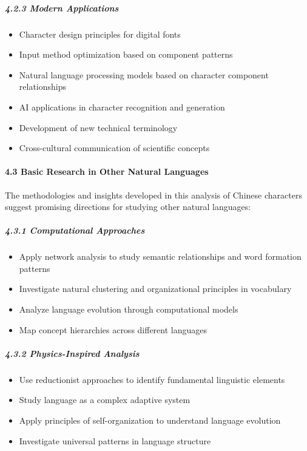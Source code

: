 \hypertarget{modern-applications}{%
\subparagraph{4.2.3 Modern Applications}\label{modern-applications}}

\begin{itemize}
\tightlist
\item
  Character design principles for digital fonts
\item
  Input method optimization based on component patterns
\item
  Natural language processing models based on character component
  relationships
\item
  AI applications in character recognition and generation
\item
  Development of new technical terminology
\item
  Cross-cultural communication of scientific concepts
\end{itemize}

\hypertarget{basic-research-in-other-natural-languages}{%
\paragraph{4.3 Basic Research in Other Natural
Languages}\label{basic-research-in-other-natural-languages}}

The methodologies and insights developed in this analysis of Chinese
characters suggest promising directions for studying other natural
languages:

\hypertarget{computational-approaches}{%
\subparagraph{4.3.1 Computational
Approaches}\label{computational-approaches}}

\begin{itemize}
\tightlist
\item
  Apply network analysis to study semantic relationships and word
  formation patterns
\item
  Investigate natural clustering and organizational principles in
  vocabulary
\item
  Analyze language evolution through computational models
\item
  Map concept hierarchies across different languages
\end{itemize}

\hypertarget{physics-inspired-analysis}{%
\subparagraph{4.3.2 Physics-Inspired
Analysis}\label{physics-inspired-analysis}}

\begin{itemize}
\tightlist
\item
  Use reductionist approaches to identify fundamental linguistic
  elements
\item
  Study language as a complex adaptive system
\item
  Apply principles of self-organization to understand language evolution
\item
  Investigate universal patterns in language structure
\end{itemize}

